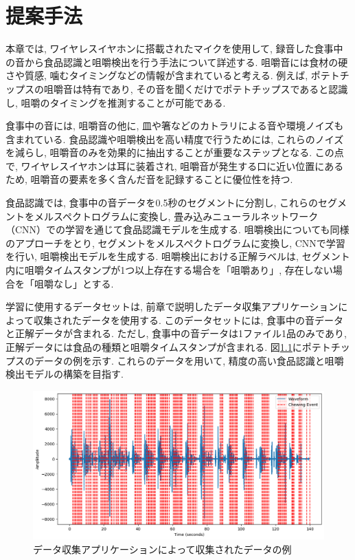 
\chapter{提案手法}

本章では, ワイヤレスイヤホンに搭載されたマイクを使用して, 録音した食事中の音から食品認識と咀嚼検出を行う手法について詳述する. 咀嚼音には食材の硬さや質感, 噛むタイミングなどの情報が含まれていると考える. 例えば, ポテトチップスの咀嚼音は特有であり, その音を聞くだけでポテトチップスであると認識し, 咀嚼のタイミングを推測することが可能である.

食事中の音には, 咀嚼音の他に, 皿や箸などのカトラリによる音や環境ノイズも含まれている. 食品認識や咀嚼検出を高い精度で行うためには, これらのノイズを減らし, 咀嚼音のみを効果的に抽出することが重要なステップとなる. この点で, ワイヤレスイヤホンは耳に装着され, 咀嚼音が発生する口に近い位置にあるため, 咀嚼音の要素を多く含んだ音を記録することに優位性を持つ.

食品認識では, 食事中の音データを0.5秒のセグメントに分割し, これらのセグメントをメルスペクトログラムに変換し, 畳み込みニューラルネットワーク（CNN）での学習を通じて食品認識モデルを生成する. 咀嚼検出についても同様のアプローチをとり, セグメントをメルスペクトログラムに変換し, CNNで学習を行い, 咀嚼検出モデルを生成する. 咀嚼検出における正解ラベルは, セグメント内に咀嚼タイムスタンプが1つ以上存在する場合を「咀嚼あり」, 存在しない場合を「咀嚼なし」とする.

学習に使用するデータセットは, 前章で説明したデータ収集アプリケーションによって収集されたデータを使用する. このデータセットには, 食事中の音データと正解データが含まれる. ただし, 食事中の音データは1ファイル1品のみであり, 正解データには食品の種類と咀嚼タイムスタンプが含まれる. 図\ref{fig:wave-sample}にポテトチップスのデータの例を示す. これらのデータを用いて, 精度の高い食品認識と咀嚼検出モデルの構築を目指す.

\begin{figure}[t]
    \begin{center}
        \includegraphics[clip,  width=0.95\hsize]{img/wave-sample.png}
        \caption{データ収集アプリケーションによって収集されたデータの例}
        \label{fig:wave-sample}
    \end{center}
\end{figure}

